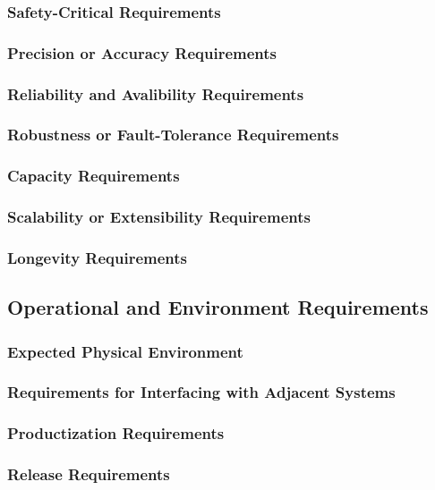 \documentclass[12pt, titlepage]{article}
\begin{document}
    \subsubsection{Safety-Critical Requirements}
    \subsubsection{Precision or Accuracy Requirements}
    \subsubsection{Reliability and Avalibility Requirements}
    \subsubsection{Robustness or Fault-Tolerance Requirements}
    \subsubsection{Capacity Requirements}
    \subsubsection{Scalability or Extensibility Requirements}
    \subsubsection{Longevity Requirements}
  
  \subsection{Operational and Environment Requirements}

	\subsubsection{Expected Physical Environment}
    \subsubsection{Requirements for Interfacing with Adjacent Systems}
    \subsubsection{Productization Requirements}
    \subsubsection{Release Requirements}
\end{document}
